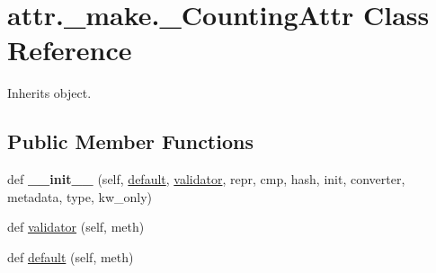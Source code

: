 \hypertarget{classattr_1_1__make_1_1___counting_attr}{}\section{attr.\+\_\+make.\+\_\+\+Counting\+Attr Class Reference}
\label{classattr_1_1__make_1_1___counting_attr}


Inherits object.

\subsection*{Public Member Functions}
\begin{DoxyCompactItemize}
\item 
\mbox{\label{classattr_1_1__make_1_1___counting_attr_a8b387af0e748a7b7924d8cf822fbeea1}} 
def {\bfseries \+\_\+\+\_\+init\+\_\+\+\_\+} (self, \hyperlink{classattr_1_1__make_1_1___counting_attr_aa1f465e9d138d51149a0446d9047c085}{default}, \hyperlink{classattr_1_1__make_1_1___counting_attr_ad1d47ecf562bb33fd365b2f9ebb193e3}{validator}, repr, cmp, hash, init, converter, metadata, type, kw\+\_\+only)
\item 
def \hyperlink{classattr_1_1__make_1_1___counting_attr_ad1d47ecf562bb33fd365b2f9ebb193e3}{validator} (self, meth)
\item 
def \hyperlink{classattr_1_1__make_1_1___counting_attr_aa1f465e9d138d51149a0446d9047c085}{default} (self, meth)
\end{DoxyCompactItemize}
